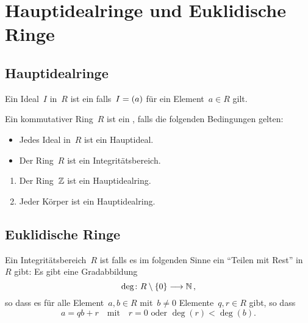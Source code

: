 \section{Hauptidealringe und Euklidische Ringe}



\subsection{Hauptidealringe}

\begin{definition}
  Ein Ideal~$I$ in~$R$ ist ein  falls~$I = (a)$ für ein Element~$a \in R$ gilt.
\end{definition}

\begin{definition}
  Ein kommutativer Ring~$R$ ist ein , falls die folgenden Bedingungen gelten:
  \begin{itemize}
    \item
      Jedes Ideal in~$R$ ist ein Hauptideal.
    \item
      Der Ring~$R$ ist ein Integritätsbereich.
  \end{itemize}
\end{definition}

\begin{example}
  \leavevmode
  \begin{enumerate}
    \item
      Der Ring~$\mathbb{Z}$ ist ein Hauptidealring.
    \item
      Jeder Körper ist ein Hauptidealring.
  \end{enumerate}
\end{example}



\subsection{Euklidische Ringe}

\begin{definition}
  Ein Integritätsbereich~$R$ ist  falls es im folgenden Sinne ein \enquote{Teilen mit Rest} in~$R$ gibt:
  Es gibt eine Gradabbildung
  \[
    \deg
    \colon
    R \setminus \{ 0 \}
    \to
    \Natural \,,
  \]
  so dass es für alle Element~$a, b \in R$ mit~$b \neq 0$ Elemente~$q, r \in R$ gibt, so dass~
  \[
    a = qb + r
    \quad\text{mit}\quad
    \text{$r = 0$ oder~$\deg(r) < \deg(b)$.}
  \]
\end{definition}

